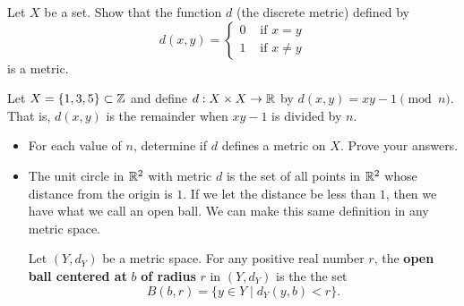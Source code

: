 {\begin{itemize}
\begin{itemize}
	\end{itemize}
	
\end{itemize}



\be

\item \label{ex:MS_discrete} Let $X$ be a set.  Show that the function $d$ (the discrete metric) defined by 
\[d(x,y) = \begin{cases} 0 & \text{ if } x=y \\ 1 & \text{ if } x \neq y \end{cases}\]
is a metric. 

\begin{comment}

\ExerciseSolution Let $x$, $y$, and $z$ be in $X$. By definition, $d(x,y) \geq 0$, $d(x,y) = 0$ if and only if $x=y$, and $d(x,y) = d(y,x)$. So the only item to prove is the triangle inequality. We consider the cases $x \neq y$ and $x = y$. 
\begin{itemize}
\item If $x \neq y$, then 
\[d(x,y) + d(y,z) \geq 1 \geq d(x,z).\]
\item If $x=y$, then 
\[d(x,y) + d(y,z) = d(y,z) = d(x,z).\]
\end{itemize}
We conclude that $d$ is a metric on any set. 

\end{comment}


\item \label{ex:MS_mod_metric} Let $X = \{1,3,5\} \subset \mathbb{Z}$ and define $d: X \times X \to \mathbb{R}$ by $d(x,y) = xy - 1 \pmod{n}$. That is, $d(x,y)$ is the remainder when $xy - 1$ is divided by $n$. 
	\begin{itemize}
	\item For each value of $n$, determine if $d$ defines a metric on $X$. Prove your answers. 
	\item The unit circle in $\mathbb{R}^2$ with metric $d$ is the set of all points in $\mathbb{R}^2$ whose distance from the origin is $1$. If we let the distance be less than $1$, then we have what we call an open ball. We can make this same definition in any metric space.
	
\begin{definition} \label{def:ms_open_ball} Let $(Y, d_Y)$ be a metric space.  For any positive real number $r$, the \textbf{open ball centered at} $b$ \textbf{of radius} $r$ in $(Y, d_Y)$ is the  the set 
\[B(b,r) = \{y \in Y \mid d_Y(y,b) < r\}.\]
\end{definition}


\end{itemize}}

